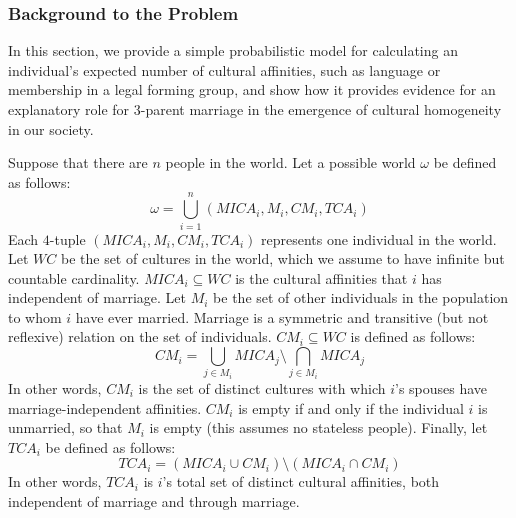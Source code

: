 
\subsubsection{Background to the Problem}

In this section, we provide a simple probabilistic model for calculating an individual's expected number of cultural affinities, such as language or membership in a legal forming group, and show how it provides evidence for an explanatory role for $3$-parent marriage in the emergence of cultural homogeneity in our society.\par 

Suppose that there are $n$ people in the world. Let a possible world $\omega$ be defined as follows:
\begin{equation}
    \omega = \bigcup_{i=1}^{n}(MICA_{i}, M_{i}, CM_{i}, TCA_{i})
\end{equation}
Each $4$-tuple $(MICA_{i}, M_{i}, CM_{i}, TCA_{i})$ represents one individual in the world. Let $WC$ be the set of cultures in the world, which we assume to have infinite but countable cardinality. $MICA_{i}\subseteq WC$ is the cultural affinities that $i$ has independent of marriage. Let $M_{i}$ be the set of other individuals in the population to whom $i$ have ever married. Marriage is a symmetric and transitive (but not reflexive) relation on the set of individuals. $CM_{i}\subseteq WC$ is defined as follows:
\begin{equation}
    CM_{i}=\bigcup_{j\in M_{i}}MICA_{j}\setminus\bigcap_{j\in M_{i}}MICA_{j}
\end{equation}
In other words, $CM_{i}$ is the set of distinct cultures with which $i$'s spouses have marriage-independent affinities. $CM_{i}$ is empty if and only if the individual $i$ is unmarried, so that $M_{i}$ is empty (this assumes no stateless people). Finally, let $TCA_{i}$ be defined as follows:
\begin{equation}
    TCA_{i}=(MICA_{i}\cup CM_{i})\setminus (MICA_{i}\cap CM_{i})
\end{equation}
In other words, $TCA_{i}$ is $i$'s total set of distinct cultural affinities, both independent of marriage and through marriage.\par 

